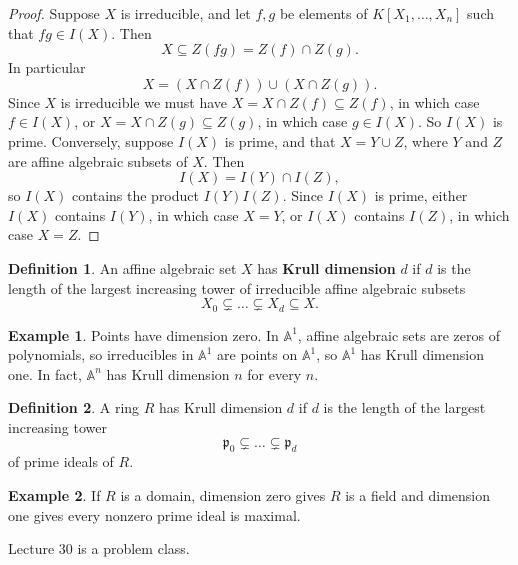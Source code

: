 \documentclass{article}
\newcommand{\A}{\mathbb{A}}
\newcommand{\rb}[1]{\left( #1 \right)}
\renewcommand{\sb}[1]{\left[ #1 \right]}
\theoremstyle{definition}\newtheorem{definition}{Definition}[subsection]
\theoremstyle{definition}\newtheorem{remark}[definition]{Remark}
\theoremstyle{definition}\newtheorem*{example}{Example}
\theoremstyle{definition}\newtheorem*{note}{Note}
\begin{document}
\begin{proof}
Suppose $ X $ is irreducible, and let $ f, g $ be elements of $ K\sb{X_1, \dots, X_n} $ such that $ fg \in I\rb{X} $. Then
$$ X \subseteq Z\rb{fg} = Z\rb{f} \cap Z\rb{g}. $$
In particular
$$ X = \rb{X \cap Z\rb{f}} \cup \rb{X \cap Z\rb{g}}. $$
Since $ X $ is irreducible we must have $ X = X \cap Z\rb{f} \subseteq Z\rb{f} $, in which case $ f \in I\rb{X} $, or $ X = X \cap Z\rb{g} \subseteq Z\rb{g} $, in which case $ g \in I\rb{X} $. So $ I\rb{X} $ is prime. Conversely, suppose $ I\rb{X} $ is prime, and that $ X = Y \cup Z $, where $ Y $ and $ Z $ are affine algebraic subsets of $ X $. Then
$$ I\rb{X} = I\rb{Y} \cap I\rb{Z}, $$
so $ I\rb{X} $ contains the product $ I\rb{Y}I\rb{Z} $. Since $ I\rb{X} $ is prime, either $ I\rb{X} $ contains $ I\rb{Y} $, in which case $ X = Y $, or $ I\rb{X} $ contains $ I\rb{Z} $, in which case $ X = Z $.
\end{proof}

\begin{definition}
An affine algebraic set $ X $ has \textbf{Krull dimension} $ d $ if $ d $ is the length of the largest increasing tower of irreducible affine algebraic subsets
$$ X_0 \subsetneq \dots \subsetneq X_d \subseteq X. $$
\end{definition}

\begin{example}
Points have dimension zero. In $ \A^1 $, affine algebraic sets are zeros of polynomials, so irreducibles in $ \A^1 $ are points on $ \A^1 $, so $ \A^1 $ has Krull dimension one. In fact, $ \A^n $ has Krull dimension $ n $ for every $ n $.
\end{example}

\begin{definition}
A ring $ R $ has Krull dimension $ d $ if $ d $ is the length of the largest increasing tower
$$ \mathfrak{p}_0 \subsetneq \dots \subsetneq \mathfrak{p}_d $$
of prime ideals of $ R $.
\end{definition}

\begin{example}
If $ R $ is a domain, dimension zero gives $ R $ is a field and dimension one gives every nonzero prime ideal is maximal.
\end{example}


Lecture 30 is a problem class.
\end{document}
